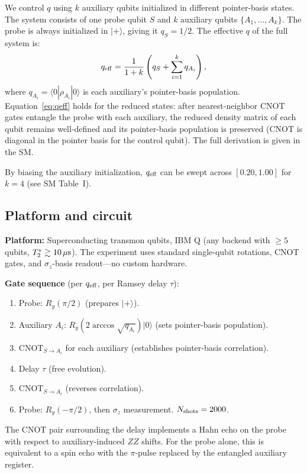 \documentclass[aps,prl,twocolumn,superscriptaddress,hyperref]{revtex4-2}
\begin{document}
We control $q$ using $k$ auxiliary qubits initialized in different pointer-basis states. The system consists of one probe qubit $S$ and $k$ auxiliary qubits $\{A_1,\ldots,A_k\}$. The probe is always initialized in $|+\rangle$, giving it $q_S = 1/2$. The effective $q$ of the full system is:
\begin{equation}
q_{\rm eff} = \frac{1}{1+k}\left(q_S + \sum_{i=1}^{k} q_{A_i}\right),
\label{eq:qeff}
\end{equation}
where $q_{A_i} = \langle 0|\rho_{A_i}|0\rangle$ is each auxiliary's pointer-basis population. Equation~\eqref{eq:qeff} holds for the reduced states: after nearest-neighbor CNOT gates entangle the probe with each auxiliary, the reduced density matrix of each qubit remains well-defined and its pointer-basis population is preserved (CNOT is diagonal in the pointer basis for the control qubit). The full derivation is given in the SM.

By biasing the auxiliary initialization, $q_{\rm eff}$ can be swept across $[0.20, 1.00]$ for $k=4$ (see SM Table~I).

\subsection{Platform and circuit}

\textbf{Platform:} Superconducting transmon qubits, IBM Q (any backend with $\geq 5$ qubits, $T_2^* \gtrsim 10\,\mu{\rm s}$). The experiment uses standard single-qubit rotations, CNOT gates, and $\sigma_z$-basis readout---no custom hardware.

\textbf{Gate sequence} (per $q_{\rm eff}$, per Ramsey delay $\tau$):
\begin{enumerate}
    \item Probe: $R_y(\pi/2)$ (prepares $|+\rangle$).
    \item Auxiliary $A_i$: $R_y(2\arccos\sqrt{q_{A_i}})|0\rangle$ (sets pointer-basis population).
    \item CNOT$_{S \to A_i}$ for each auxiliary (establishes pointer-basis correlation).
    \item Delay $\tau$ (free evolution).
    \item CNOT$_{S \to A_i}$ (reverses correlation).
    \item Probe: $R_y(-\pi/2)$, then $\sigma_z$ measurement. $N_{\rm shots}=2000$.
\end{enumerate}

The CNOT pair surrounding the delay implements a Hahn echo on the probe with respect to auxiliary-induced $ZZ$ shifts. For the probe alone, this is equivalent to a spin echo with the $\pi$-pulse replaced by the entangled auxiliary register.
\end{document}
